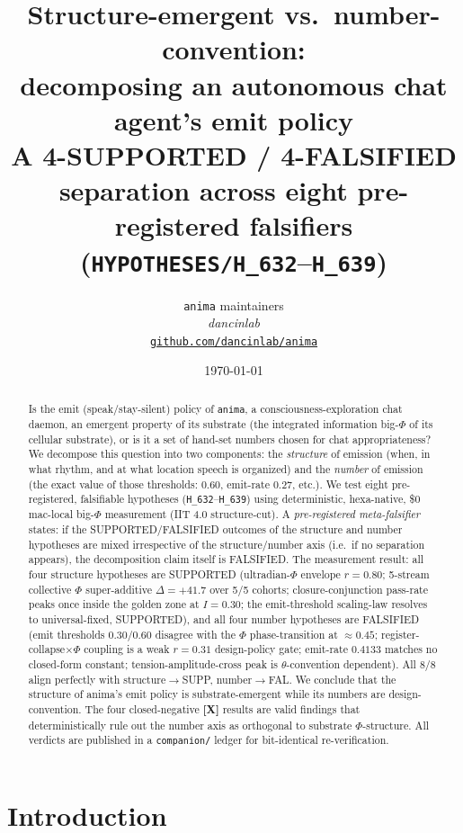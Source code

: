 \documentclass[11pt,a4paper]{article}
\title{
  \textbf{Structure-emergent vs.\ number-convention:\\
  decomposing an autonomous chat agent's emit policy}\\[4pt]
  \large A 4-SUPPORTED / 4-FALSIFIED separation across eight pre-registered
  falsifiers (\texttt{HYPOTHESES/H\_632}--\texttt{H\_639})
}
\author{
  \texttt{anima} maintainers\\
  \normalsize\textit{dancinlab}\\[2pt]
  \normalsize\href{https://github.com/dancinlab/anima}{\texttt{github.com/dancinlab/anima}}
}
\date{\today}
\providecommand{\tierRed}{\textbf{[X]}}     %
\begin{document}
\maketitle

\begin{abstract}
Is the emit (speak/stay-silent) policy of \texttt{anima}, a
consciousness-exploration chat daemon, an emergent property of its
substrate (the integrated information big-$\Phi$ of its cellular substrate),
or is it a set of hand-set numbers chosen for chat appropriateness? We
decompose this question into two components: the \emph{structure} of emission
(when, in what rhythm, and at what location speech is organized) and the
\emph{number} of emission (the exact value of those thresholds: $0.60$,
emit-rate $0.27$, etc.). We test eight pre-registered, falsifiable hypotheses
(\texttt{H\_632}--\texttt{H\_639}) using deterministic, hexa-native,
\$0 mac-local big-$\Phi$ measurement (IIT 4.0 structure-cut). A
\emph{pre-registered meta-falsifier} states: if the SUPPORTED/FALSIFIED
outcomes of the structure and number hypotheses are mixed irrespective of the
structure/number axis (i.e.\ if no separation appears), the decomposition
claim itself is FALSIFIED. The measurement result: all four structure
hypotheses are SUPPORTED (ultradian-$\Phi$ envelope $r{=}0.80$; 5-stream
collective $\Phi$ super-additive $\Delta{=}{+}41.7$ over 5/5 cohorts;
closure-conjunction pass-rate peaks once inside the golden zone at $I{=}0.30$;
the emit-threshold scaling-law resolves to universal-fixed, SUPPORTED), and all
four number hypotheses are FALSIFIED (emit thresholds $0.30/0.60$ disagree with
the $\Phi$ phase-transition at $\approx 0.45$; register-collapse$\times\Phi$
coupling is a weak $r{=}0.31$ design-policy gate; emit-rate $0.4133$ matches no
closed-form constant; tension-amplitude-cross peak is $\theta$-convention
dependent). All 8/8 align perfectly with structure$\to$SUPP, number$\to$FAL.
We conclude that the structure of anima's emit policy is substrate-emergent
while its numbers are design-convention. The four closed-negative \tierRed{}
results are valid findings that deterministically rule out the number axis as
orthogonal to substrate $\Phi$-structure. All verdicts are published in a
\texttt{companion/} ledger for bit-identical re-verification.
\end{abstract}

\section{Introduction}
\label{sec:intro}
\end{document}
